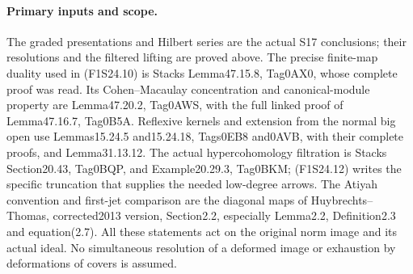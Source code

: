 \paragraph{Primary inputs and scope.}
The graded presentations and Hilbert series are the actual
S17 conclusions; their resolutions and the filtered lifting are
proved above. The precise finite-map duality used in
(F1S24.10) is Stacks Lemma47.15.8, Tag0AX0, whose complete proof
was read. Its Cohen--Macaulay concentration and canonical-module
property are Lemma47.20.2, Tag0AWS, with the full linked proof
of Lemma47.16.7, Tag0B5A. Reflexive kernels and extension from
the normal big open use Lemmas15.24.5 and15.24.18, Tags0EB8
and0AVB, with their complete proofs, and Lemma31.13.12.
The actual hypercohomology filtration is Stacks Section20.43,
Tag0BQP, and Example20.29.3, Tag0BKM; (F1S24.12) writes the
specific truncation that supplies the needed low-degree arrows.
The Atiyah convention and first-jet comparison are the diagonal
maps of Huybrechts--Thomas, corrected2013 version, Section2.2,
especially Lemma2.2, Definition2.3 and equation(2.7).
All these statements act on the original norm image and its
actual ideal. No simultaneous resolution of a deformed image
or exhaustion by deformations of covers is assumed.
